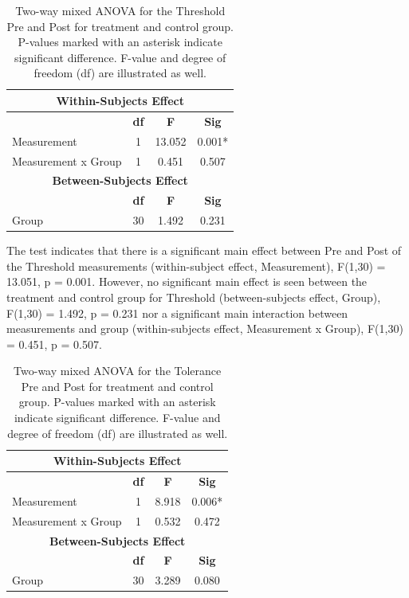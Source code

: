 \begin{table}[ht]
\caption{Two-way mixed ANOVA for the Threshold Pre and Post for treatment and control group. P-values marked with an asterisk indicate significant difference. F-value and degree of freedom (df) are illustrated as well.}
\centering
\begin{tabular}{l c c c}
\toprule
\multicolumn{4}{c}{\textbf{Within-Subjects Effect}} \\
\midrule
& \textbf{df} &\textbf{F} & \textbf{Sig} \\ [0.5ex] %
Measurement & 1 & 13.052 &  0.001* \\
Measurement x Group & 1 & 0.451 & 0.507 \\
\toprule
\multicolumn{4}{c}{\textbf{Between-Subjects Effect}} \\
\midrule 
& \textbf{df} & \textbf{F} & \textbf{Sig} \\ [0.5ex] %
Group & 30 & 1.492 &  0.231 \\
\hline
\end{tabular}
\label{table:TWOWAYANOVA1}
\end{table}

The test indicates that there is a significant main effect between Pre and Post of the Threshold measurements (within-subject effect, Measurement), F(1,30) = 13.051, p = 0.001. However, no significant main effect is seen between the treatment and control group for Threshold (between-subjects effect, Group), F(1,30) = 1.492, p = 0.231 nor a significant main interaction between measurements and group (within-subjects effect, Measurement x Group), F(1,30) = 0.451, p = 0.507. 

\begin{table}[ht]
\caption{Two-way mixed ANOVA for the Tolerance Pre and Post for treatment and control group. P-values marked with an asterisk indicate significant difference. F-value and degree of
freedom (df) are illustrated as well.}
\centering
\begin{tabular}{l c c c}
\toprule
\multicolumn{4}{c}{\textbf{Within-Subjects Effect}} \\
\midrule  
& \textbf{df} & \textbf{F} & \textbf{Sig} \\ [0.5ex] %
Measurement & 1 &  8.918 &  0.006* \\
Measurement x Group & 1 & 0.532 & 0.472 \\
\toprule
\multicolumn{4}{c}{\textbf{Between-Subjects Effect}} \\
\midrule
 & \textbf{df} & \textbf{F} & \textbf{Sig} \\ [0.5ex] %
Group & 30 & 3.289 &  0.080 \\
\hline
\end{tabular}
\label{table:TWOWAYANOVA2}
\end{table}

